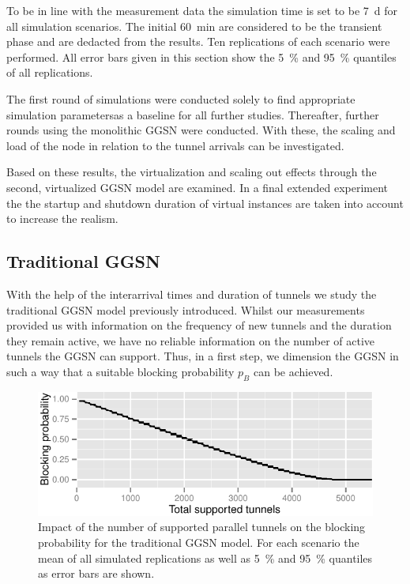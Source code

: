 To be in line with the measurement data the simulation time is set to be \SI{7}{\day} for all simulation scenarios. The initial \SI{60}{\minute} are considered to be the transient phase and are dedacted from the results. Ten replications of each scenario were performed. All error bars given in this section show the \SI{5}{\percent} and \SI{95}{\percent} quantiles of all replications.

The first round of simulations were conducted solely to find appropriate simulation parametersas a baseline for all further studies. Thereafter, further rounds using the monolithic \gls{GGSN} were conducted. With these, the scaling and load of the node in relation to the tunnel arrivals can be investigated.

Based on these results, the virtualization and scaling out effects  through the second, virtualized \gls{GGSN} model are examined. In a final extended experiment the the startup and shutdown duration of virtual instances are taken into account to increase the realism.


\subsection{Traditional GGSN}
\label{c4:sec:eval_traditional_ggsn}

With the help of the interarrival times and duration of tunnels we study the traditional \gls{GGSN} model previously introduced. Whilst our measurements provided us with information on the frequency of new tunnels and the duration they remain active, we have no reliable information on the number of active tunnels the \gls{GGSN} can support. Thus, in a first step, we dimension the \gls{GGSN} in such a way that a suitable blocking probability $p_B$ can be achieved.

\begin{figure}[htb]
  \centering
    \includegraphics[width=1.0\textwidth]{images/traditional-blocking.pdf}
  \caption{Impact of the number of supported parallel tunnels on the blocking probability for the traditional \gls{GGSN} model. For each scenario the mean of all simulated replications as well as \SI{5}{\percent} and \SI{95}{\percent} quantiles as error bars are shown.}
  \label{c4:fig:traditional_blocking}
\end{figure}

